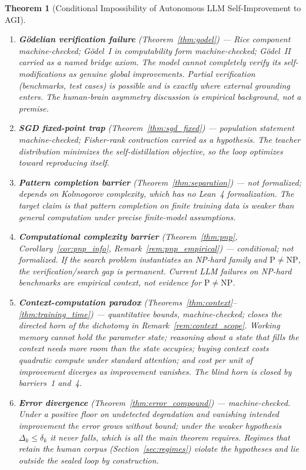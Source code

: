 \documentclass[11pt,a4paper]{article}
\newtheorem{theorem}{Theorem}[section]
\begin{document}
\begin{theorem}[Conditional Impossibility of Autonomous LLM Self-Improvement to AGI]
\begin{enumerate}
    \item \textbf{G\"{o}delian verification failure} (Theorem~\ref{thm:godel}) --- \emph{Rice component machine-checked; G\"{o}del~I in computability form machine-checked; G\"{o}del~II carried as a named bridge axiom.} The model cannot completely verify its self-modifications as genuine global improvements. Partial verification (benchmarks, test cases) is possible and is exactly where external grounding enters. The human-brain asymmetry discussion is empirical background, not a premise.

    \item \textbf{SGD fixed-point trap} (Theorem~\ref{thm:sgd_fixed}) --- \emph{population statement machine-checked; Fisher-rank contraction carried as a hypothesis.} The teacher distribution minimizes the self-distillation objective, so the loop optimizes toward reproducing itself.

    \item \textbf{Pattern completion barrier} (Theorem~\ref{thm:separation}) --- \emph{not formalized; depends on Kolmogorov complexity, which has no Lean~4 formalization.} The target claim is that pattern completion on finite training data is weaker than general computation under precise finite-model assumptions.

    \item \textbf{Computational complexity barrier} (Theorem~\ref{thm:pnp}, Corollary~\ref{cor:pnp_info}, Remark~\ref{rem:pnp_empirical}) --- \emph{conditional; not formalized.} If the search problem instantiates an NP-hard family and $\mathrm{P} \neq \mathrm{NP}$, the verification/search gap is permanent. Current LLM failures on NP-hard benchmarks are empirical context, not evidence for $\mathrm{P} \neq \mathrm{NP}$.

    \item \textbf{Context-computation paradox} (Theorems~\ref{thm:context}--\ref{thm:training_time}) --- \emph{quantitative bounds, machine-checked; closes the directed horn of the dichotomy in Remark~\ref{rem:context_scope}.} Working memory cannot hold the parameter state; reasoning about a state that fills the context needs more room than the state occupies; buying context costs quadratic compute under standard attention; and cost per unit of improvement diverges as improvement vanishes. The blind horn is closed by barriers~1 and~4.

    \item \textbf{Error divergence} (Theorem~\ref{thm:error_compound}) --- \emph{machine-checked.} Under a positive floor on undetected degradation and vanishing intended improvement the error grows without bound; under the weaker hypothesis $\Delta_k \leq \delta_k$ it never falls, which is all the main theorem requires. Regimes that retain the human corpus (Section~\ref{sec:regimes}) violate the hypotheses and lie outside the sealed loop by construction.
\end{enumerate}


\end{theorem}
\end{document}
